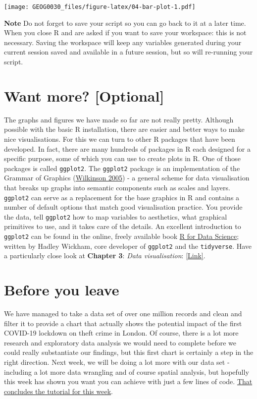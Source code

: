 \documentclass[
]{book}
\begin{document}
\texttt{[image: GEOG0030\_files/figure-latex/04-bar-plot-1.pdf]}

\textbf{Note}
Do not forget to save your script so you can go back to it at a later time. When you close R and are asked if you want to save your workspace: this is not necessary. Saving the workspace will keep any variables generated during your current session saved and available in a future session, but so will re-running your script.

\hypertarget{want-more-optional}{%
\section{Want more? {[}Optional{]}}\label{want-more-optional}}

The graphs and figures we have made so far are not really pretty. Although possible with the basic R installation, there are easier and better ways to make nice visualisations. For this we can turn to other R packages that have been developed. In fact, there are many hundreds of packages in R each designed for a specific purpose, some of which you can use to create plots in R. One of those packages is called \texttt{ggplot2}. The \texttt{ggplot2} package is an implementation of the Grammar of Graphics (\href{https://en.wikipedia.org/wiki/Leland_Wilkinson}{Wilkinson 2005}) - a general scheme for data visualisation that breaks up graphs into semantic components such as scales and layers. \texttt{ggplot2} can serve as a replacement for the base graphics in R and contains a number of default options that match good visualisation practice. You provide the data, tell \texttt{ggplot2} how to map variables to aesthetics, what graphical primitives to use, and it takes care of the details. An excellent introduction to \texttt{ggplot2} can be found in the online, freely available book \href{https://r4ds.had.co.nz/data-visualisation.html}{R for Data Science}; written by Hadley Wickham, core developer of \texttt{ggplot2} and the \texttt{tidyverse}. Have a particularly close look at \textbf{Chapter 3}: \emph{Data visualisation}: \href{https://r4ds.had.co.nz/data-visualisation.html}{{[}Link{]}}.

\hypertarget{byl-w04}{%
\section{Before you leave}\label{byl-w04}}

We have managed to take a data set of over one million records and clean and filter it to provide a chart that actually shows the potential impact of the first COVID-19 lockdown on theft crime in London. Of course, there is a lot more research and exploratory data analysis we would need to complete before we could really substantiate our findings, but this first chart is certainly a step in the right direction. Next week, we will be doing a lot more with our data set - including a lot more data wrangling and of course spatial analysis, but hopefully this week has shown you want you can achieve with just a few lines of code. \href{https://www.youtube.com/watch?v=NKyYr2pbXUM}{That concludes the tutorial for this week}.
\end{document}
